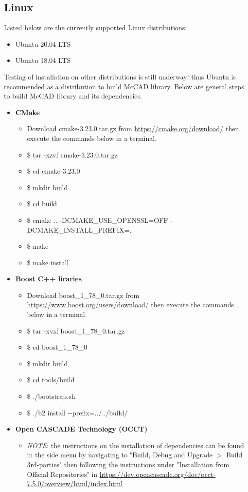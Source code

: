 \documentclass[letterpaper, 10 pt]{report}
\begin{document}
  \subsection{Linux}
  Listed below are the currently supported Linux distributions:
  \begin{itemize}
  	\item Ubuntu 20.04 LTS
  	\item Ubuntu 18.04 LTS
  \end{itemize} 
  Testing of installation on other distributions is still underway! thus Ubuntu is recommended as a distribution to build McCAD library. Below are general steps to build McCAD library and its dependencies.
  \begin{itemize}
  	\item \textbf{CMake}
  	\begin{itemize}
  		\item Download cmake-3.23.0.tar.gz from \url{https://cmake.org/download/} then execute the commands below in a terminal.
  		\item \$ tar -xzvf cmake-3.23.0.tar.gz
  		\item \$ cd cmake-3.23.0
  		\item \$ mkdir build
  		\item \$ cd build
  		\item \$ cmake .. -DCMAKE\_USE\_OPENSSL=OFF -DCMAKE\_INSTALL\_PREFIX=.
  		\item \$ make
  		\item \$ make install
  	\end{itemize}
    \item \textbf{Boost C++ liraries}
    \begin{itemize}
    	\item Download boost\_1\_78\_0.tar.gz from \url{https://www.boost.org/users/download/} then execute the commands below in a terminal.
    	\item \$ tar -xvzf boost\_1\_78\_0.tar.gz
    	\item \$ cd boost\_1\_78\_0
    	\item \$ mkdir build
    	\item \$ cd tools/build
    	\item \$ ./bootstrap.sh
    	\item \$ ./b2 install -\--prefix=../../build/
    \end{itemize}
    \item \textbf{Open CASCADE Technology (OCCT)}
    \begin{itemize}
        \item \emph{NOTE}: the instructions on the installation of dependencies can be found in the side menu by navigating to "Build, Debug and Upgrade $>$ Build 3rd-parties" then following the instructions under "Installation from Official Repositories" in \url{https://dev.opencascade.org/doc/occt-7.5.0/overview/html/index.html}

\end{itemize}
\end{itemize}
\end{document}
